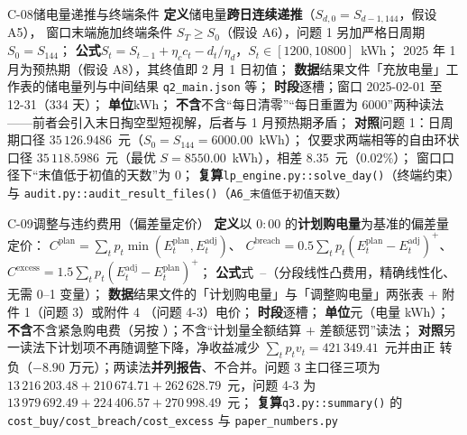 \begin{caliber}{C-08}{储电量递推与终端条件}
\textbf{定义}\quad 储电量\textbf{跨日连续递推}（\(S_{d,0}=S_{d-1,144}\)，假设 A5），
窗口末端施加终端条件 \(S_T\ge S_0\)（假设 A6），问题 1 另加严格日周期 \(S_0=S_{144}\)；%
\textbf{公式}\quad \(S_t=S_{t-1}+\eta_cc_t-d_t/\eta_d\)，\(S_t\in[1200,10800]\)~kWh；
2025 年 1 月为预热期（假设 A8），其终值即 2 月 1 日初值；%
\textbf{数据}\quad 结果文件「充放电量」工作表的储电量列与中间结果 \texttt{q2\_main.json} 等；%
\textbf{时段}\quad 逐槽；窗口 2025-02-01 至 12-31（334 天）；%
\textbf{单位}\quad kWh；%
\textbf{不含}\quad 不含“每日清零”“每日重置为 6000”两种读法——前者会引入末日掏空型短视解，后者与 1 月预热期矛盾；%
\textbf{对照}\quad 问题 1：日周期口径 \(35\,126.9486\)~元（\(S_0=S_{144}=6000.00\)~kWh）；
仅要求两端相等的自由环状口径 \(35\,118.5986\)~元（最优 \(S=8550.00\)~kWh），相差 \(8.35\)~元（\(0.02\%\)）；
窗口口径下“末值低于初值的天数”为 0；%
\textbf{复算}\quad \texttt{lp\_engine.py::solve\_day()}（终端约束）与 \texttt{audit.py::audit\_result\_files()}（\texttt{A6\_末值低于初值天数}）
\end{caliber}



\begin{caliber}{C-09}{调整与违约费用（偏差量定价）}
\textbf{定义}\quad 以 \(0{:}00\) 的\textbf{计划购电量}为基准的偏差量定价：
\(C^{\text{plan}}=\sum_tp_t\min(E^{\text{plan}}_t,E^{\text{adj}}_t)\)、
\(C^{\text{breach}}=0.5\sum_tp_t(E^{\text{plan}}_t-E^{\text{adj}}_t)^{+}\)、
\(C^{\text{excess}}=1.5\sum_tp_t(E^{\text{adj}}_t-E^{\text{plan}}_t)^{+}\)；%
\textbf{公式}\quad 式~--（分段线性凸费用，精确线性化、无需
0--1 变量）；%
\textbf{数据}\quad 结果文件的「计划购电量」与「调整购电量」两张表 \(+\) 附件 1（问题 3）或附件 4
（问题 4-3）电价；%
\textbf{时段}\quad 逐槽；%
\textbf{单位}\quad 元（电量 kWh）；%
\textbf{不含}\quad 不含紧急购电费（另按 ）；不含“计划量全额结算 \(+\) 差额惩罚”读法；%
\textbf{对照}\quad 另一读法下计划项不再随调整下降，净收益减少 \(\sum_tp_tv_t=421\,349.41\)~元并由正
转负（\(-8.90\) 万元）；两读法\textbf{并列报告}、不合并。问题 3 主口径三项为
\(13\,216\,203.48+210\,674.71+262\,628.79\)~元，问题 4-3 为
\(13\,979\,692.49+224\,406.57+270\,998.49\)~元；%
\textbf{复算}\quad \texttt{q3.py::summary()} 的 \texttt{cost\_buy/cost\_breach/cost\_excess}
与 \texttt{paper\_numbers.py}
\end{caliber}

